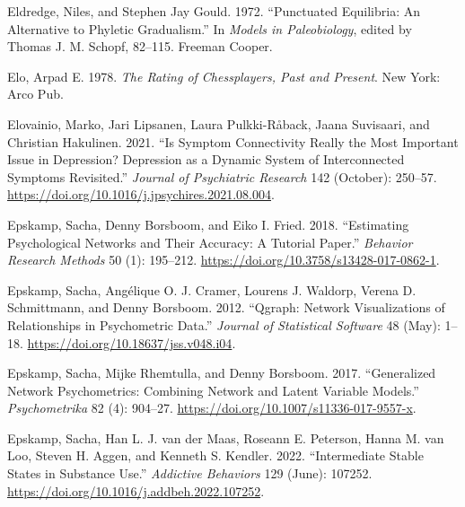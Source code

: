 \documentclass[
  a4paper,
  DIV=11,
  numbers=noendperiod,
  oneside]{scrreprt}
\newlength{\cslhangindent}
\newlength{\cslentryspacingunit} %
\newenvironment{CSLReferences}[2] %
 {%
  \setlength{\parindent}{0pt}
  \ifodd #1
  \let\oldpar\par
  \def\par{\hangindent=\cslhangindent\oldpar}
  \fi
  \setlength{\parskip}{#2\cslentryspacingunit}
 }%
 {}
\begin{document}
\begin{CSLReferences}{1}{0}
\leavevmode{}%
Eldredge, Niles, and Stephen Jay Gould. 1972. {``Punctuated
{Equilibria}: {An Alternative} to {Phyletic Gradualism}.''} In
\emph{Models in {Paleobiology}}, edited by Thomas J. M. Schopf, 82--115.
{Freeman Cooper}.

\leavevmode{}%
Elo, Arpad E. 1978. \emph{The Rating of Chessplayers, Past and Present}.
{New York}: {Arco Pub}.

\leavevmode{}%
Elovainio, Marko, Jari Lipsanen, Laura Pulkki-Råback, Jaana Suvisaari,
and Christian Hakulinen. 2021. {``Is Symptom Connectivity Really the
Most Important Issue in Depression? {Depression} as a Dynamic System of
Interconnected Symptoms Revisited.''} \emph{Journal of Psychiatric
Research} 142 (October): 250--57.
\url{https://doi.org/10.1016/j.jpsychires.2021.08.004}.

\leavevmode{}%
Epskamp, Sacha, Denny Borsboom, and Eiko I. Fried. 2018. {``Estimating
Psychological Networks and Their Accuracy: {A} Tutorial Paper.''}
\emph{Behavior Research Methods} 50 (1): 195--212.
\url{https://doi.org/10.3758/s13428-017-0862-1}.

\leavevmode{}%
Epskamp, Sacha, Angélique O. J. Cramer, Lourens J. Waldorp, Verena D.
Schmittmann, and Denny Borsboom. 2012. {``Qgraph: {Network
Visualizations} of {Relationships} in {Psychometric Data}.''}
\emph{Journal of Statistical Software} 48 (May): 1--18.
\url{https://doi.org/10.18637/jss.v048.i04}.

\leavevmode{}%
Epskamp, Sacha, Mijke Rhemtulla, and Denny Borsboom. 2017.
{``Generalized {Network Psychometrics}: {Combining Network} and {Latent
Variable Models}.''} \emph{Psychometrika} 82 (4): 904--27.
\url{https://doi.org/10.1007/s11336-017-9557-x}.

\leavevmode{}%
Epskamp, Sacha, Han L. J. van der Maas, Roseann E. Peterson, Hanna M.
van Loo, Steven H. Aggen, and Kenneth S. Kendler. 2022. {``Intermediate
Stable States in Substance Use.''} \emph{Addictive Behaviors} 129
(June): 107252. \url{https://doi.org/10.1016/j.addbeh.2022.107252}.


\end{CSLReferences}
\end{document}
